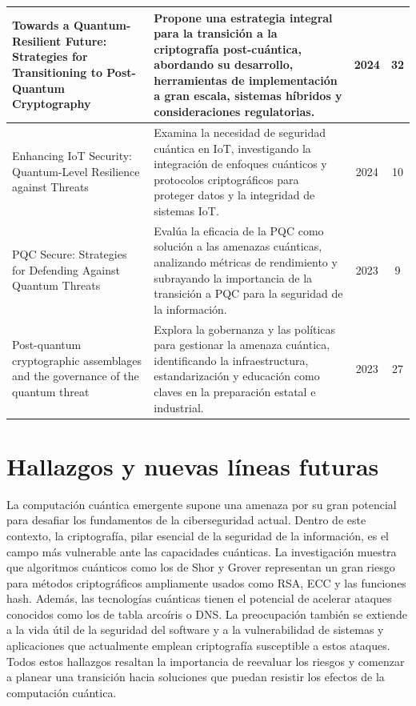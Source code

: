 \begin{longtable}{@{}  p{4.5cm} p{6.5cm} c c @{}}
\hline
Towards a Quantum-Resilient Future: Strategies for Transitioning to Post-Quantum Cryptography~\cite{Aydeger2024} & Propone una estrategia integral para la transición a la criptografía post-cuántica, abordando su desarrollo, herramientas de implementación a gran escala, sistemas híbridos y consideraciones regulatorias. & 2024 & 32 \\
\hline
Enhancing IoT Security: Quantum-Level Resilience against Threats~\cite{Alhakami2024} & Examina la necesidad de seguridad cuántica en IoT, investigando la integración de enfoques cuánticos y protocolos criptográficos para proteger datos y la integridad de sistemas IoT. & 2024 & 10 \\
\hline
PQC Secure: Strategies for Defending Against Quantum Threats~\cite{Jenefa2023} & Evalúa la eficacia de la PQC como solución a las amenazas cuánticas, analizando métricas de rendimiento y subrayando la importancia de la transición a PQC para la seguridad de la información. & 2023 & 9 \\
\hline
Post-quantum cryptographic assemblages and the governance of the quantum threat~\cite{Csenkey2023} & Explora la gobernanza y las políticas para gestionar la amenaza cuántica, identificando la infraestructura, estandarización y educación como claves en la preparación estatal e industrial. & 2023 & 27 \\
\end{longtable}

\section{Hallazgos y nuevas líneas futuras}

La computación cuántica emergente supone una amenaza por su gran potencial para desafiar los fundamentos de la ciberseguridad actual. Dentro de este contexto, la criptografía, pilar esencial de la seguridad de la información, es el campo más vulnerable ante las capacidades cuánticas. La investigación muestra que algoritmos cuánticos como los de Shor y Grover representan un gran riesgo para métodos criptográficos ampliamente usados como RSA, ECC y las funciones hash. Además, las tecnologías cuánticas tienen el potencial de acelerar ataques conocidos como los de tabla arcoíris o DNS. La preocupación también se extiende a la vida útil de la seguridad del software y a la vulnerabilidad de sistemas y aplicaciones que actualmente emplean criptografía susceptible a estos ataques. Todos estos hallazgos resaltan la importancia de reevaluar los riesgos y comenzar a planear una transición hacia soluciones que puedan resistir los efectos de la computación cuántica.

